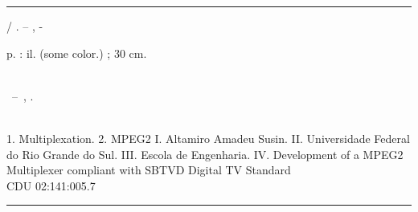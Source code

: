 \documentclass[
	12pt,				%
	openright,			%
	twoside,			%
	a4paper,			%
	brazil,
	french,				%
	english
	]{abntex2}
\begin{document}
\frenchspacing 


\imprimircapa

\imprimirfolhaderosto*


%
%     
\begin{fichacatalografica}
	\vspace*{\fill}					%
	\hrule							%
	\begin{center}					%
	\begin{minipage}[c]{12.5cm}		%
	
	\imprimirautor
	
	\hspace{0.5cm} \imprimirtitulo  / \imprimirautor. --
	\imprimirlocal, \imprimirdata-
	
	\hspace{0.5cm} \pageref{LastPage} p. : il. (some color.) ; 30 cm.\\
	
	\hspace{0.5cm} \imprimirorientadorRotulo~\imprimirorientador\\
	
	\hspace{0.5cm}
	\parbox[t]{\textwidth}{\imprimirtipotrabalho~--~\imprimirinstituicao,
	\imprimirdata.}\\
	
	\hspace{0.5cm}
		1. Multiplexation.
		2. MPEG2
		I. Altamiro Amadeu Susin.
		II. Universidade Federal do Rio Grande do Sul.
		III. Escola de Engenharia.
		IV. Development of a MPEG2 Multiplexer compliant with SBTVD Digital TV Standard\\
	
	\hspace{8.75cm} CDU 02:141:005.7\\
	
	\end{minipage}
	\end{center}
	\hrule
\end{fichacatalografica}
\end{document}
